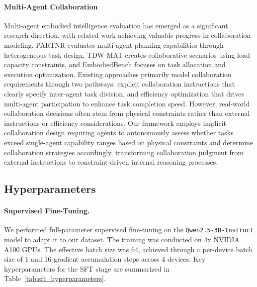 \paragraph{Multi-Agent Collaboration}
Multi-agent embodied intelligence evaluation has emerged as a significant research direction, with related work achieving valuable progress in collaboration modeling\citep{sun2024aml,wang2024large}. PARTNR evaluates multi-agent planning capabilities through heterogeneous task design, TDW-MAT \citep{zhang2024buildingcooperativeembodiedagents} creates collaborative scenarios using load capacity constraints, and EmbodiedBench \citep{yang2025embodiedbench} focuses on task allocation and execution optimization. Existing approaches primarily model collaboration requirements through two pathways: explicit collaboration instructions that clearly specify inter-agent task division, and efficiency optimization that drives multi-agent participation to enhance task completion speed. However, real-world collaboration decisions often stem from physical constraints rather than external instructions or efficiency considerations. Our framework employs implicit collaboration design requiring agents to autonomously assess whether tasks exceed single-agent capability ranges based on physical constraints and determine collaboration strategies accordingly, transforming collaboration judgment from external instructions to constraint-driven internal reasoning processes.

\subsection{Hyperparameters}

\label{sec:hyperparameters}

\paragraph{Supervised Fine-Tuning.}
We performed full-parameter supervised fine-tuning on the \texttt{Qwen2.5-3B-Instruct} model to adapt it to our dataset. The training was conducted on 4x NVIDIA A100 GPUs. The effective batch size was 64, achieved through a per-device batch size of 1 and 16 gradient accumulation steps across 4 devices. Key hyperparameters for the SFT stage are summarized in Table~\ref{tab:sft_hyperparameters}.

